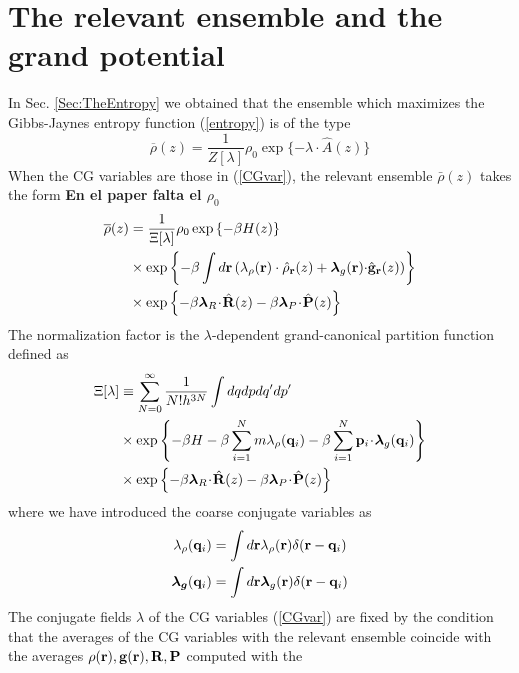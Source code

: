 \documentclass[b5paper,openright,10pt]{book}
\newcommand{\esc}{\!\cdot\!}
\newcommand{\Note}[1]{{\bf \color{red}#1}}    %
\begin{document}
\section{The relevant ensemble and the grand potential}
In Sec. \ref{Sec:TheEntropy} we obtained that the ensemble which maximizes the Gibbs-Jaynes entropy function (\ref{entropy}) is of the type
\begin{equation}
\overline{\rho}(z) = \frac{1}{Z[\lambda]} \rho_0\exp\{-\lambda\!\cdot\!\hat{A}(z)\}
\end{equation}
When the CG variables are those in (\ref{CGvar}), the relevant ensemble $\bar{\rho}(z)$ takes the form \Note{En el paper falta el $\rho_0$}
\begin{align}
  \overline{\rho}(z)&=\frac{1}{\Xi[\lambda]}\rho_0\exp\left\{-\beta H(z)\right\}
\nonumber\\
&\times
\exp\left\{-\beta\int d{\bf r}\left(\lambda_\rho({\bf r})\cdot\hat{\rho}_{\bf
    r}(z)+\boldsymbol{\lambda}_g{({\bf r})\cdot}\hat{\bf g}_{\bf r}(z)\right)\right\}
\nonumber\\
&\times
\exp\left\{-\beta \boldsymbol{\lambda}_{R}\esc\hat{\bf R}(z)
-\beta \boldsymbol{\lambda}_{P}\esc\hat{\bf P}(z)\right\}
\nonumber\\
\label{relensln}
\end{align}
The   normalization   factor   is  the   $\lambda$-dependent
grand-canonical partition function defined as
\begin{align}
  \Xi[\lambda]
  &\equiv
 \sum_{N=0}^\infty \frac{1}{N!h^{3N}}
\int dqdp dq'dp'
\nonumber\\
&\times\exp\left\{-\beta H-\beta \sum_{i=1}^Nm \lambda_\rho({\bf
    q}_i)-\beta \sum_{i=1}^N{\bf p}_i\esc\boldsymbol{\lambda}_g({\bf q}_i)\right\}
\nonumber\\
&\times\exp\left\{-\beta \boldsymbol{\lambda}_{R}\esc\hat{\bf R}(z)
-\beta \boldsymbol{\lambda}_{P}\esc\hat{\bf P}(z)\right\}
\label{xiln}
\end{align}
where we have introduced the coarse conjugate variables as
  \begin{align}
\lambda_\rho({\bf q}_i)&=
\int d{\bf r}\lambda_{\rho}({\bf r})\delta({\bf r}-{\bf q}_i)
\nonumber\\
\boldsymbol{\lambda_g}({\bf q}_i)&=
\int d{\bf r}\boldsymbol{\lambda}_g({\bf r})\delta({\bf r}-{\bf q}_i)
  \end{align}
The conjugate fields $\lambda$ of the CG variables (\ref{CGvar}) are fixed by the condition that the averages of the CG variables with the relevant ensemble coincide with the averages $\rho({\bf  r}),{\bf  g}({\bf
  r}),{\bf  R},{\bf  P}$  computed  with  the 
\end{document}
